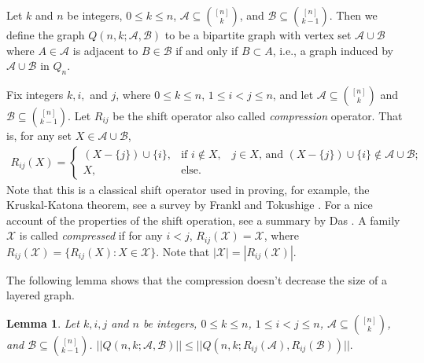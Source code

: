 \documentclass[11pt, a4paper]{article}
\newtheorem{lemma}[theorem]{Lemma}
\newcommand{\cA}{\mathcal{A}}
\newcommand{\cB}{\mathcal{B}}
\newcommand{\cX}{\mathcal{X}}
\begin{document}
Let $k$ and $n$ be integers,  $0\leq k\leq n$,  $\cA\subseteq\binom{[n]}{k}$, and $\cB\subseteq\binom{[n]}{k-1}$. 
	Then we define  the graph $Q(n,k;\cA,\cB)$ to be  a bipartite graph with vertex set $\cA\cup\cB$ where $A\in\cA$ is adjacent to $B\in\cB$ if and only if $B\subset A$, i.e., 
	a graph induced by $\cA\cup \cB$ in $Q_n$.
	
	Fix integers $k, i, $ and $j$, where $0\leq k\leq n$, $1\leq i<j\leq n$,  and let $\cA\subseteq\binom{[n]}{k}$ and $\cB\subseteq\binom{[n]}{k-1}$. 
	Let $R_{ij}$ be the shift operator also called {\it compression} operator. That is, for any set $X\in \cA\cup \cB$,
	\begin{align*}
		R_{ij}(X) 	= 	\left\{ 	\begin{array}{ll}
						 		(X-\{j\})\cup\{i\}, 		&\mbox{if $i\not\in X$, ~ $j\in X$, and $(X-\{j\})\cup\{i\}\not\in \cA\cup \cB;$ }\\
								X, 				&\mbox{else.}
							\end{array}\right.
							\end{align*}
	Note that this is a classical shift operator used in proving, for example, the Kruskal-Katona theorem, see  a survey by Frankl and Tokushige  \cite{FT}. For a nice account of the properties of the shift operation, see a summary by Das \cite{Das}. 
	A family  $\cX$ is called {\it compressed}  if for any $i<j$, $R_{ij}(\cX) = \cX$, where $R_{ij}(\cX) = \{ R_{ij}(X): X\in \cX\}$. Note that $|\cX|= |R_{ij}(\cX)|$. 



The following lemma shows that the compression doesn't decrease the size of a layered graph.

\begin{lemma}\label{compressed}
Let $k, i, j $ and $n$ be  integers,  $0\leq k\leq n$, $1\leq i<j\leq n$,   $\cA\subseteq\binom{[n]}{k}$, and $\cB\subseteq\binom{[n]}{k-1}$. 
$||Q(n,k;\cA,\cB)|| \leq ||Q(n,k; R_{ij}(\cA), R_{ij}(\cB))||.$
\end{lemma}
\end{document}
